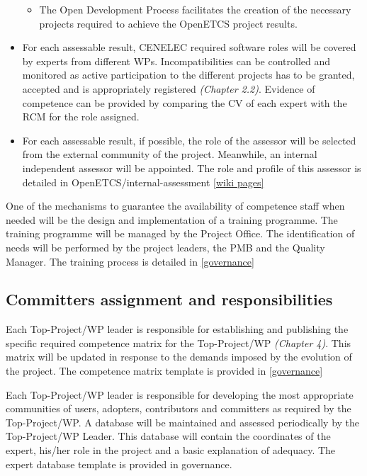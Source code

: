 \documentclass{template/openetcs_article}
\begin{document}
\begin{itemize}
\begin{itemize}
\item The Open Development Process facilitates the creation of the necessary projects required to achieve the OpenETCS project results.
\end{itemize}
\item For each assessable result, CENELEC required software roles will be covered by experts from different WPs. Incompatibilities can be controlled and monitored as active participation to the different projects has to be granted, accepted and is appropriately registered  \textit{(Chapter 2.2)}. Evidence of competence can be provided by comparing the CV of each expert with the RCM for the role assigned.
\item For each assessable result, if possible, the role of the \gls{assessor} will be selected from the external community of the project. Meanwhile, an internal independent \gls{assessor} will be appointed. The role and profile of this \gls{assessor} is detailed in OpenETCS/internal-assessment \citep{IA} \href{https://github.com/openETCS/ecosystem/wiki/WP4:-internal-assessment}{[wiki pages]}
\end{itemize}

One of the mechanisms to guarantee the availability of competence staff when needed will be the design and implementation of a training programme. The training programme will be managed by the Project Office. The identification of needs will be performed by the project leaders, the PMB and the Quality Manager. 
The training process is detailed in \href{https://github.com/openETCS/governance/tree/master/Training%20Process}{[governance]}


\subsection{Committers assignment and responsibilities}

Each Top-Project/\gls{WP} leader is responsible for establishing and publishing the specific required competence matrix for the Top-Project/\gls{WP} \textit{(Chapter 4)}. This matrix will be updated in response to the demands imposed by the evolution of the project. The competence matrix template \citep{Competence}is provided in \href{https://github.com/openETCS/governance/tree/master/Templates}{[governance]}

Each Top-Project/\gls{WP} leader is responsible for developing the most appropriate communities of users, adopters, contributors and committers as required by the Top-Project/\gls{WP}. A database will be maintained and assessed periodically by the Top-Project/\gls{WP} Leader. This database will contain the coordinates of the expert, his/her role in the project and a basic explanation of adequacy. The expert database template is provided in governance.
\end{document}
